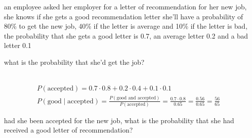 \documentclass[a4paper,12pt]{article}
\newcommand{\?}{\stackrel{?}{=}}
\begin{document}
\begin{question}
an employee asked her employer for a letter of recommendation for her new job, she knows if she gets a good recommendation letter she'll have a probability of 80\% to get the new job, 40\% if the letter is average and 10\% if the letter is bad, the probability that she gets a good letter is 0.7, an average letter 0.2 and a bad letter 0.1\\[0pt]
\begin{subquestion}
what is the probability that she'd get the job?\\[0pt]
\begin{answer}
\begin{center}

\end{center}\\[0pt]

\begin{gather*}
  P(\text{accepted}) = 0.7 \cdot 0.8 + 0.2 \cdot 0.4 + 0.1 \cdot 0.1\\
  P(\text{good} \mid \text{accepted}) = \frac{P(\text{good and accepted})}{P(\text{accepted})} = \frac{0.7 \cdot 0.8}{0.65} = \frac{0.56}{0.65} = \frac{56}{65}
\end{gather*}
\end{answer}
\end{subquestion}
\begin{subquestion}
had she been accepted for the new job, what is the probability that she had received a good letter of recommendation?\\[0pt]
\end{subquestion}
\end{question}
\end{document}

